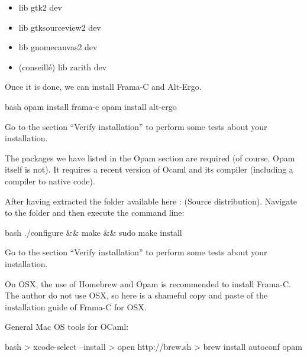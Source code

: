 \begin{itemize}
\item lib gtk2 dev
\item lib gtksourceview2 dev
\item lib gnomecanvas2 dev
\item (conseillé) lib zarith dev
\end{itemize}



Once it is done, we can install Frama-C and Alt-Ergo.




\begin{CodeBlock}{bash}
opam install frama-c
opam install alt-ergo
\end{CodeBlock}



Go to the section ``Verify installation'' to perform some tests about
your installation.





The packages we have listed in the Opam section are required (of course,
Opam itself is not). It requires a recent version of Ocaml and its
compiler (including a compiler to native code).



After having extracted the folder available here :
 (Source distribution).
Navigate to the folder and then execute the command line:



\begin{CodeBlock}{bash}
./configure && make && sudo make install
\end{CodeBlock}



Go to the section ``Verify installation'' to perform some tests about
your installation.





On OSX, the use of Homebrew and Opam is recommended to install Frama-C.
The author do not use OSX, so here is a shameful copy and paste of the
installation guide of Frama-C for OSX.




General Mac OS tools for OCaml:



\begin{CodeBlock}{bash}
> xcode-select --install 
> open http://brew.sh
> brew install autoconf opam 
\end{CodeBlock}



